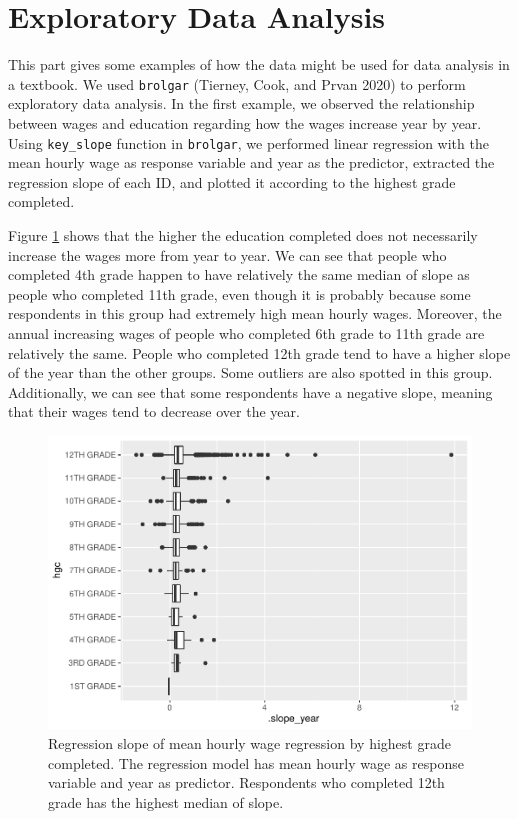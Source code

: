 \documentclass{article}
\begin{document}
\hypertarget{exploratory-data-analysis}{%
\section{Exploratory Data Analysis}\label{exploratory-data-analysis}}

This part gives some examples of how the data might be used for data analysis in a textbook. We used \texttt{brolgar} (Tierney, Cook, and Prvan 2020) to perform exploratory data analysis. In the first example, we observed the relationship between wages and education regarding how the wages increase year by year. Using \texttt{key\_slope} function in \texttt{brolgar}, we performed linear regression with the mean hourly wage as response variable and year as the predictor, extracted the regression slope of each ID, and plotted it according to the highest grade completed.

Figure \ref{fig:slope-fig} shows that the higher the education completed does not necessarily increase the wages more from year to year. We can see that people who completed 4th grade happen to have relatively the same median of slope as people who completed 11th grade, even though it is probably because some respondents in this group had extremely high mean hourly wages. Moreover, the annual increasing wages of people who completed 6th grade to 11th grade are relatively the same. People who completed 12th grade tend to have a higher slope of the year than the other groups. Some outliers are also spotted in this group. Additionally, we can see that some respondents have a negative slope, meaning that their wages tend to decrease over the year.

\begin{figure}
\centering
\includegraphics{figures/slope-fig-1.pdf}
\caption{\label{fig:slope-fig}Regression slope of mean hourly wage regression by highest grade completed. The regression model has mean hourly wage as response variable and year as predictor. Respondents who completed 12th grade has the highest median of slope.}
\end{figure}
\end{document}

